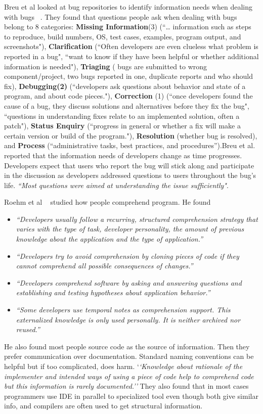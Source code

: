 Breu et al looked at bug repositories to identify information needs when dealing with bugs ~\cite{Breu:2010}. They found that questions people ask when dealing with bugs belong to 8 categories: \textbf{Missing Information}(3) (``… information such as steps to reproduce, build numbers, OS, test cases, examples, program output, and screenshots"), \textbf{Clarification} (``Often developers are even clueless what problem is reported in a bug", ``want to know if they have been helpful or whether additional information is needed"), \textbf{Triaging} ( bugs are submitted to wrong component/project, two bugs reported in one, duplicate reports and who should fix), \textbf{Debugging(2)} (``developers ask questions about behavior and state of a program, and about code pieces."), \textbf{Correction }(1) (``once developers found the cause of a bug, they discuss solutions and alternatives before they fix the bug", ``questions in understanding fixes relate to an implemented solution, often a patch"), \textbf{Status Enquiry} (``progress in general or whether a fix will make a certain version or build of the program."), \textbf{Resolution} (whether bug is resolved), and \textbf{Process} (“administrative tasks, best practices, and procedures”).Breu et al. reported that the information needs of developers change as time progresses. Developers expect that users who report the bug will stick along and participate in the discussion as developers addressed questions to users throughout the bug’s life. \textit{``Most questions were aimed at understanding the issue sufficiently"}.

Roehm et al ~\cite{Roehm:2012} studied how people comprehend program. He found
\begin{itemize}
\item \textit{``Developers usually follow a recurring, structured comprehension strategy that varies with the type of task, developer personality, the amount of previous knowledge about the application and the type of application.''}
\item \textit{``Developers try to avoid comprehension by cloning pieces of code if they cannot comprehend all possible consequences of changes.''}
\item \textit{``Developers comprehend software by asking and answering questions and establishing and testing hypotheses about application behavior.''}
\item \textit{``Some developers use temporal notes as comprehension support. This externalized knowledge is only used personally. It is neither archived nor reused.''}
\end{itemize}
He also found most people source code as the source of information. Then they prefer communication over documentation. Standard naming conventions can be helpful but if too complicated, does harm. `\textit{`Knowledge about rationale of the implementer and intended ways of using a piece of code help to comprehend code but this information is rarely documented.''} They also found that in most cases programmers use IDE in parallel to specialized tool even though both give similar info, and compilers are often used to get structural information.

